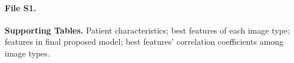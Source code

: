 \documentclass[10pt,letterpaper]{article}
\begin{document}
%

\paragraph*{File S1.}
\label{S1_File}
{\bf Supporting Tables.}
Patient characteristics; best features of each image type; features in final
proposed model; best features' correlation coefficients among image types.
\end{document}
